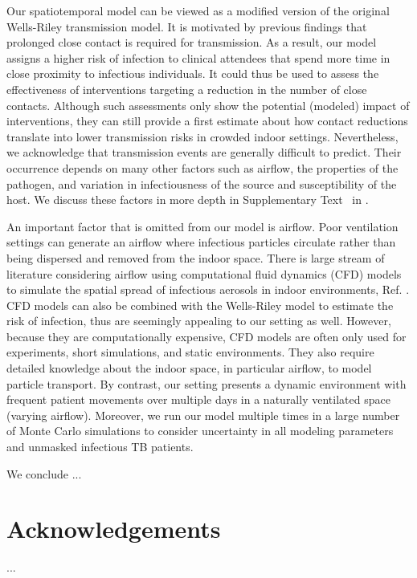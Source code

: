 \documentclass[fleqn,11pt]{wlscirep}
\begin{document}


Our spatiotemporal model can be viewed as a modified version of the original Wells-Riley transmission model\cite{Riley1978AJE}. It is motivated by previous findings that prolonged close contact is required for transmission\cite{Leung2020NatMed,Brankston2007LancetID,Narasimhan2013PulmonaryMed}. As a result, our model assigns a higher risk of infection to clinical attendees that spend more time in close proximity to infectious individuals. It could thus be used to assess the effectiveness of interventions targeting a reduction in the number of close contacts. Although such assessments only show the potential (modeled) impact of interventions, they can still provide a first estimate about how contact reductions translate into lower transmission risks in crowded indoor settings. Nevertheless, we acknowledge that transmission events are generally difficult to predict. Their occurrence depends on many other factors such as airflow, the properties of the pathogen, and variation in infectiousness of the source and susceptibility of the host\cite{Wang2021Science}. We discuss these factors in more depth in Supplementary Text~ in \supp.

An important factor that is omitted from our model is airflow. Poor ventilation settings can generate an airflow where infectious particles circulate rather than being dispersed and removed from the indoor space\cite{Li2021BuildEnv}. There is large stream of literature considering airflow using computational fluid dynamics (CFD) models to simulate the spatial spread of infectious aerosols in indoor environments, \eg Ref. \cite{Vuorinen2020SafSci,Jung2021InfectChemo,Li2021BuildEnv}. CFD models can also be combined with the Wells-Riley model to estimate the risk of infection\cite{Yan2023BE,Qian2009BE,Li2022SOTTE}, thus are seemingly appealing to our setting as well. However, because they are computationally expensive, CFD models are often only used for experiments, short simulations, and static environments. They also require detailed knowledge about the indoor space, in particular airflow, to model particle transport. By contrast, our setting presents a dynamic environment with frequent patient movements over multiple days in a naturally ventilated space (varying airflow). Moreover, we run our model multiple times in a large number of Monte Carlo simulations to consider uncertainty in all modeling parameters and unmasked infectious TB patients. 



We conclude ...


\newpage


\section*{Acknowledgements}
...


\end{document}
